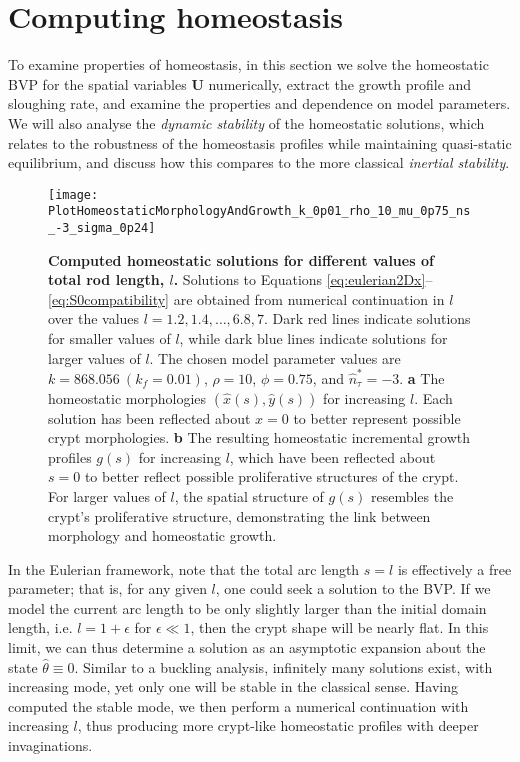 \section{Computing homeostasis}
\label{sec:computinghomeostasis}
To examine properties of homeostasis, in this section we solve the homeostatic BVP for the spatial variables $\mathbf{U}$ numerically, extract the growth profile and sloughing rate, and examine the properties and dependence on model parameters. We will also analyse the \emph{dynamic stability} of the homeostatic solutions, which relates to the robustness of the homeostasis profiles while maintaining quasi-static equilibrium, and discuss how this compares to the more classical \emph{inertial stability}. 
\begin{figure*}[t!]
	\centering
	\texttt{[image: PlotHomeostaticMorphologyAndGrowth\_k\_0p01\_rho\_10\_mu\_0p75\_ns\_-3\_sigma\_0p24]}
	\caption{\textbf{Computed homeostatic solutions for different values of total rod length, $l$.} Solutions to Equations \eqref{eq:eulerian2Dx}--\eqref{eq:S0compatibility} are obtained from numerical continuation in $l$ over the values $l = 1.2, 1.4, \dots, 6.8, 7$. Dark red lines indicate solutions for smaller values of $l$, while dark blue lines indicate solutions for larger values of $l$. The chosen model parameter values are $k = 868.056\  (k_f = 0.01)$, $\rho = 10$, $\phi = 0.75$, and $\hat{n}_\tau^* = -3$. \textbf{a} The homeostatic morphologies $(\hat{x}(s), \hat{y}(s))$ for increasing $l$. Each solution has been reflected about $x = 0$ to better represent possible crypt morphologies. \textbf{b} The resulting homeostatic incremental growth profiles $g(s)$ for increasing $l$, which have been reflected about $s = 0$ to better reflect possible proliferative structures of the crypt. For larger values of $l$, the spatial structure of $g(s)$ resembles the crypt's proliferative structure, demonstrating the link between morphology and homeostatic growth.}
	\label{fig:2Dhomeostaticmorphologies}
\end{figure*}

In the Eulerian framework, note that the total arc length $s=l$ is effectively a free parameter; that is, for any given $l$, one could seek a solution to the BVP. If we model the current arc length to be only slightly larger than the initial domain length, i.e. $l=1+\epsilon $ for $\epsilon\ll1$, then the crypt shape will be nearly flat. In this limit, we can thus determine a solution as an asymptotic expansion about the state $\hat\theta\equiv0$. Similar to a buckling analysis, infinitely many solutions exist, with increasing mode, yet only one will be stable in the classical sense. Having computed the stable mode, we then perform a numerical continuation with increasing $l$, thus producing more crypt-like homeostatic profiles with deeper invaginations. 

